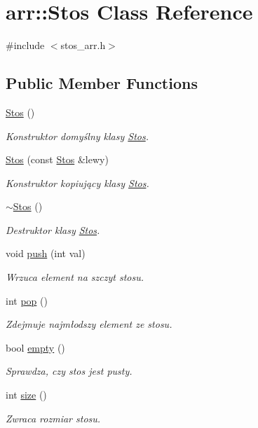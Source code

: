 \hypertarget{classarr_1_1_stos}{\section{arr\-:\-:Stos Class Reference}
\label{classarr_1_1_stos}
}


{\ttfamily \#include $<$stos\-\_\-arr.\-h$>$}

\subsection*{Public Member Functions}
\begin{DoxyCompactItemize}
\item 
\hyperlink{classarr_1_1_stos_acc173736bd233091fe1205c7b2ad08e3}{Stos} ()
\begin{DoxyCompactList}\small\item\em Konstruktor domyślny klasy \hyperlink{classarr_1_1_stos}{Stos}. \end{DoxyCompactList}\item 
\hyperlink{classarr_1_1_stos_a3fa4c0909a0a8af714a7a41925c9bfc4}{Stos} (const \hyperlink{classarr_1_1_stos}{Stos} \&lewy)
\begin{DoxyCompactList}\small\item\em Konstruktor kopiujący klasy \hyperlink{classarr_1_1_stos}{Stos}. \end{DoxyCompactList}\item 
\hyperlink{classarr_1_1_stos_aab930de62382058082057237c0651c85}{$\sim$\-Stos} ()
\begin{DoxyCompactList}\small\item\em Destruktor klasy \hyperlink{classarr_1_1_stos}{Stos}. \end{DoxyCompactList}\item 
void \hyperlink{classarr_1_1_stos_a818b45b7e1133cf8666a8996795823a6}{push} (int val)
\begin{DoxyCompactList}\small\item\em Wrzuca element na szczyt stosu. \end{DoxyCompactList}\item 
int \hyperlink{classarr_1_1_stos_a3d8fd4cebbcc8eb5aed6bfe15e1b86d8}{pop} ()
\begin{DoxyCompactList}\small\item\em Zdejmuje najmłodszy element ze stosu. \end{DoxyCompactList}\item 
bool \hyperlink{classarr_1_1_stos_aa65aee46af4fbfe791b7419d9e2dc2d1}{empty} ()
\begin{DoxyCompactList}\small\item\em Sprawdza, czy stos jest pusty. \end{DoxyCompactList}\item 
int \hyperlink{classarr_1_1_stos_a7f40cb3055b25794dfd484e6e8bd4822}{size} ()
\begin{DoxyCompactList}\small\item\em Zwraca rozmiar stosu. \end{DoxyCompactList}\end{DoxyCompactItemize}
